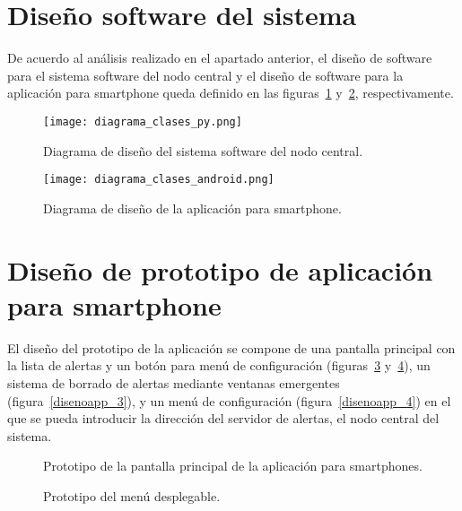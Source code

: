    \section{Diseño software del sistema}
    
    De acuerdo al análisis realizado en el apartado anterior, el diseño de software para el sistema software del nodo central y el diseño de software para la aplicación para smartphone queda definido en las figuras~\ref{diagrama_clases_py} y~\ref{diagrama_clases_android}, respectivamente.
    
    \begin{figure}[!ht]
      \centering
        \texttt{[image: diagrama\_clases\_py.png]}
      \caption{Diagrama de diseño del sistema software del nodo central.}
      \label{diagrama_clases_py}
    \end{figure}
    
    \begin{figure}[H]
      \centering
        \texttt{[image: diagrama\_clases\_android.png]}
      \caption{Diagrama de diseño de la aplicación para smartphone.}
      \label{diagrama_clases_android}
    \end{figure}

    \section{Diseño de prototipo de aplicación para smartphone}
    \label{sec:disenoapp}

    El diseño del prototipo de la aplicación se compone de una pantalla principal con la lista de alertas y un botón para menú de configuración (figuras~\ref{disenoapp_1} y~\ref{disenoapp_2}), un sistema de borrado de alertas mediante ventanas emergentes (figura~\ref{disenoapp_3}), y un menú de configuración (figura~\ref{disenoapp_4}) en el que se pueda introducir la dirección del servidor de alertas, el nodo central del sistema. \\

    \begin{figure}[!ht]
      \centering
      {%
        \setlength{\fboxsep}{0pt}%
        \setlength{\fboxrule}{1pt}%
      }%
      \caption{Prototipo de la pantalla principal de la aplicación para smartphones.}
      \label{disenoapp_1}
    \end{figure}

    \begin{figure}[!ht]
      \centering
      {%
        \setlength{\fboxsep}{0pt}%
        \setlength{\fboxrule}{1pt}%
      }%
      \caption{Prototipo del menú desplegable.}
      \label{disenoapp_2}
    \end{figure}

